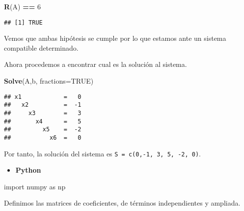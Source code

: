 \documentclass[
]{article}
\newenvironment{Shaded}{\begin{snugshade}}{\end{snugshade}}
\newcommand{\DataTypeTok}[1]{\textcolor[rgb]{0.13,0.29,0.53}{#1}}
\newcommand{\DecValTok}[1]{\textcolor[rgb]{0.00,0.00,0.81}{#1}}
\newcommand{\ImportTok}[1]{#1}
\newcommand{\KeywordTok}[1]{\textcolor[rgb]{0.13,0.29,0.53}{\textbf{#1}}}
\newcommand{\NormalTok}[1]{#1}
\newcommand{\OperatorTok}[1]{\textcolor[rgb]{0.81,0.36,0.00}{\textbf{#1}}}
\newcommand{\OtherTok}[1]{\textcolor[rgb]{0.56,0.35,0.01}{#1}}
\newcommand{\StringTok}[1]{\textcolor[rgb]{0.31,0.60,0.02}{#1}}
\providecommand{\tightlist}{%
  \setlength{\itemsep}{0pt}\setlength{\parskip}{0pt}}
\begin{document}
\begin{Shaded}
\begin{Highlighting}[]
\KeywordTok{R}\NormalTok{(A) }\OperatorTok{==}\StringTok{ }\DecValTok{6}
\end{Highlighting}
\end{Shaded}

\begin{verbatim}
## [1] TRUE
\end{verbatim}

Vemos que ambas hipótesis se cumple por lo que estamos ante un sistema
compatible determinado.

Ahora procedemos a encontrar cual es la solución al sistema.

\begin{Shaded}
\begin{Highlighting}[]
\KeywordTok{Solve}\NormalTok{(A,b, }\DataTypeTok{fractions=}\OtherTok{TRUE}\NormalTok{)}
\end{Highlighting}
\end{Shaded}

\begin{verbatim}
## x1            =   0 
##   x2          =  -1 
##     x3        =   3 
##       x4      =   5 
##         x5    =  -2 
##           x6  =   0
\end{verbatim}

Por tanto, la solución del sistema es
\texttt{S\ =\ c(0,-1,\ 3,\ 5,\ -2,\ 0)}.

\begin{itemize}
\tightlist
\item
  \textbf{Python}
\end{itemize}

\begin{Shaded}
\begin{Highlighting}[]
\ImportTok{import}\NormalTok{ numpy }\ImportTok{as}\NormalTok{ np}
\end{Highlighting}
\end{Shaded}

Definimos las matrices de coeficientes, de términos independientes y
ampliada.
\end{document}
